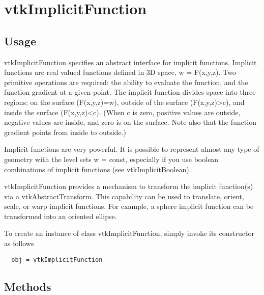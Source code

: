 \section{vtkImplicitFunction}

\subsection{Usage}

 vtkImplicitFunction specifies an abstract interface for implicit
 functions. Implicit functions are real valued functions defined in 3D
 space, w = F(x,y,z). Two primitive operations are required: the ability to
 evaluate the function, and the function gradient at a given point. The 
 implicit function divides space into three regions: on the surface
 (F(x,y,z)=w), outside of the surface (F(x,y,z)>c), and inside the
 surface (F(x,y,z)<c). (When c is zero, positive values are outside,
 negative values are inside, and zero is on the surface. Note also
 that the function gradient points from inside to outside.)

 Implicit functions are very powerful. It is possible to represent almost
 any type of geometry with the level sets w = const, especially if you use 
 boolean combinations of implicit functions (see vtkImplicitBoolean).

 vtkImplicitFunction provides a mechanism to transform the implicit
 function(s) via a vtkAbstractTransform.  This capability can be used to 
 translate, orient, scale, or warp implicit functions.  For example, 
 a sphere implicit function can be transformed into an oriented ellipse. 

To create an instance of class vtkImplicitFunction, simply
invoke its constructor as follows
\begin{verbatim}
  obj = vtkImplicitFunction
\end{verbatim}
\subsection{Methods}

